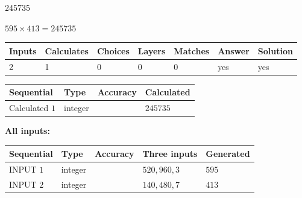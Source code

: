\documentclass{ctexart}
\begin{document}
 

245735
 
 
\noindent{}
 
 

 
 
 
\noindent{}
 
 

$ %
595 \times  %
413=   %
245735$
 
 
\noindent{}
 
 

 
   
   
   
   
\noindent\begin{tabular}{|l|l|l|l|l|l|l|}
 \hline
Inputs & Calculates & Choices & Layers & Matches & Answer & Solution \\ \hline
 2  & 
 1  & 
 0
  & 
 0  & 
 0  & 
  yes & 
  yes 
  \\ \hline
 \end{tabular}
   
   
   
   
\noindent{}
   
   
  
  
\noindent\begin{tabular}{|l|l|l|l|}
\hline
 Sequential & Type & Accuracy & Calculated \\ 
\hline
 
 
  Calculated $  1 $ & integer &  & 
  $ 245735 $ 
 \\  \hline  
 \end{tabular}
   
   
   
   
\noindent\vspace{0.1in}\hspace{-0.08in} {\textbf{\Large{All inputs: }}}
   
   
  
  
\noindent\begin{tabular}{|l|l|l|l|l|}
\hline
 Sequential & Type & Accuracy & Three inputs & Generated \\ 
\hline
 
 
  INPUT $  1 $ & integer &  & $
 520
 , 
 960
 , 
 3
 $ & $ 595 $ 
 \\  \hline  
 
 
  INPUT $  2 $ & integer &  & $
 140
 , 
 480
 , 
 7
 $ & $ 413 $ 
 \\  \hline  
 \end{tabular}
   
\end{document}
